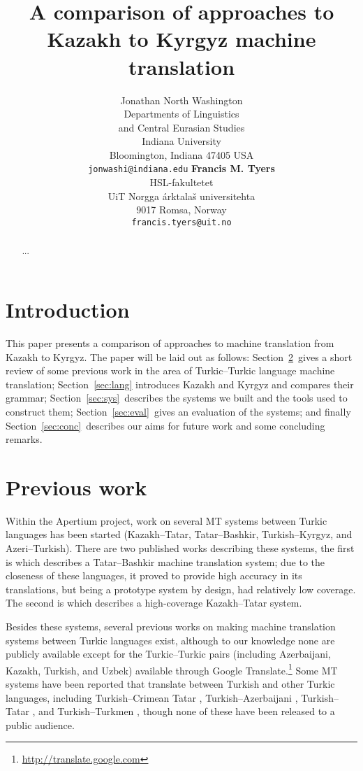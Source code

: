 \documentclass[11pt]{article}
\title{A comparison of approaches to Kazakh to Kyrgyz machine translation}
\author{
  Jonathan North Washington\\
  Departments of Linguistics\\
  and Central Eurasian Studies\\
  Indiana University\\
  Bloomington, Indiana 47405 USA\\
  \texttt{jonwashi@indiana.edu}  \And
  \textbf{Francis M. Tyers}\\
  HSL-fakultetet\\ 
  UiT Norgga \'{a}rktala\v{s} universitehta \\
  9017 Romsa, Norway \\
  {\tt francis.tyers@uit.no}
}
\date{}
\begin{document}
\maketitle

\begin{abstract}
...
\end{abstract}

\section{Introduction}

This paper presents a comparison of approaches to machine translation
from Kazakh to Kyrgyz.
The paper will be laid out as follows: Section~\ref{sec:prev}\ gives a short review of some previous work in the area of Turkic--Turkic language machine translation; Section~\ref{sec:lang} introduces Kazakh and Kyrgyz and compares their grammar;
Section~\ref{sec:sys}\ describes the systems we built and the tools used to construct them;
Section~\ref{sec:eval}\ gives an evaluation of the systems; and
finally Section~\ref{sec:conc}\ describes our aims for future work and some
concluding remarks.


\section{Previous work}
\label{sec:prev}

Within the Apertium project, work on several MT systems between Turkic languages has been started (Kazakh--Tatar, Tatar--Bashkir, Turkish--Kyrgyz, and Azeri--Turkish).  There are two published works describing these systems, the first is \cite{tyerswashingtonsalimzyanbattalov12} which describes a Tatar--Bashkir machine translation system; due to the closeness of these languages, it proved to provide high accuracy in its translations, but being a prototype system by design, had relatively low coverage. The second is \cite{tyerswashingtonsalimzyan13} which describes a high-coverage Kazakh--Tatar system.

Besides these systems, several previous works on making machine translation systems between Turkic languages 
exist, although to our knowledge none are publicly available except for the Turkic--Turkic pairs (including Azerbaijani, Kazakh, Turkish, and Uzbek) available through Google Translate.\footnote{\url{http://translate.google.com}}
Some MT systems have been reported that translate between Turkish and other Turkic languages, 
including Turkish--Crimean Tatar \citep{altintas01},
Turkish--Azerbaijani \citep{hamzaoglu93}, Turkish--Tatar \citep{suleymanov08}, and
Turkish--Turkmen \citep{tantug07}, though none of these have been released to a public audience. 
\end{document}
